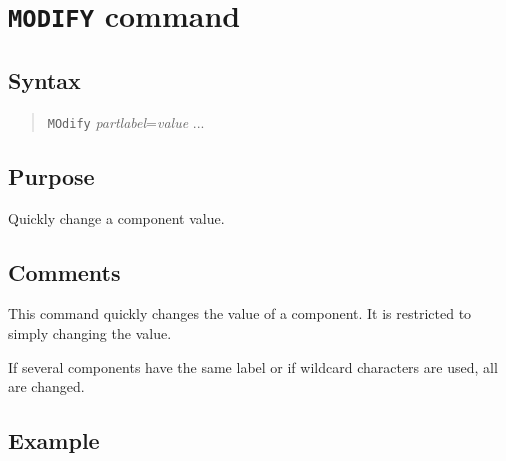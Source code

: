 %
%
%
%
\section{{\tt MODIFY} command}
\subsection{Syntax}
\begin{verse}
{\tt MOdify} {\it partlabel}={\it value} ...
\end{verse}
\subsection{Purpose}

Quickly change a component value.
\subsection{Comments}

This command quickly changes the value of a component.  It is restricted to
simply changing the value.

If several components have the same label or if wildcard characters are
used, all are changed.
\subsection{Example}

